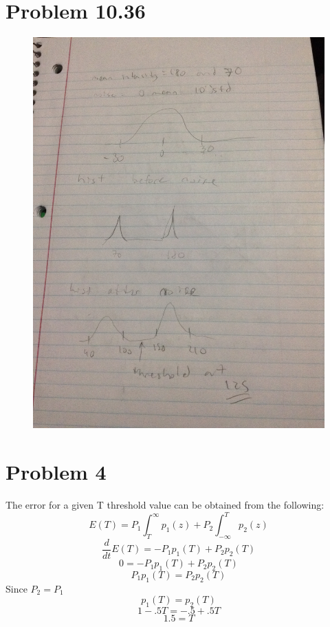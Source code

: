 \documentclass{article}
\begin{document}
	
	\newpage
	\section{Problem 10.36}
	
	\begin{figure}[H]
		\includegraphics[width=\linewidth]{fig1.JPG}
	\end{figure}
	
	\newpage
	\section{Problem 4}
	
	The error for a given T threshold value can be obtained from the following:
	\[ E(T) = P_1\int_{T}^{\infty}p_1(z) + P_2\int_{-\infty}^{T}p_2(z) \]
	\[ \frac{d}{dt}E(T) = -P_1p_1(T) + P_2p_2(T) \]
	\[ 0 = -P_1p_1(T) +  P_2p_2(T) \]
	\[ P_1p_1(T) = P_2p_2(T) \]
	Since \( P_2 = P_1 \)
	\[ p_1(T) = p_2(T) \]
	\[ 1 - .5T = -.5 + .5T \]
	\[ 1.5 = T \]
	
\end{document}
